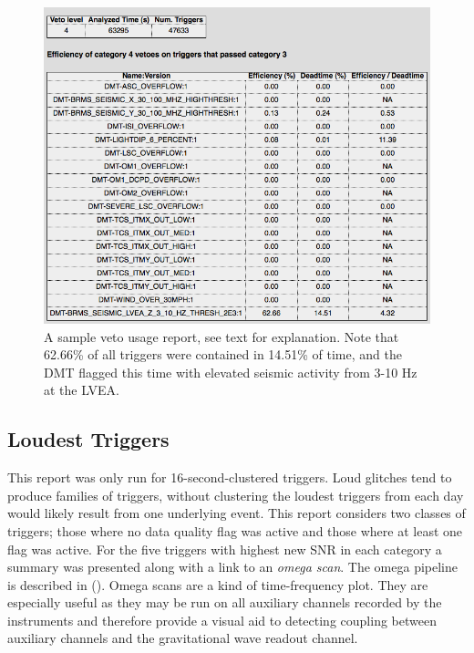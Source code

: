 \begin{figure}
  \includegraphics[width=\linewidth]{figures/detchar/vetousage.png}
  \caption[Sample veto usage report from Aug 19, 2010]{
  \label{f:daily_ihope_vetousage}
A sample veto usage report, see text for explanation.  Note that 62.66\% of
all triggers were contained in 14.51\% of time, and the DMT flagged this time
with elevated seismic activity from 3-10 Hz at the LVEA.}
\end{figure}%

\subsection{Loudest Triggers}

This report was only run for 16-second-clustered triggers.  Loud
glitches tend to produce families of triggers,  without clustering the
loudest triggers from each day would likely result from one underlying
event.  This report considers two classes of triggers; those where no
data quality flag was active and those where at least one flag was
active.  For the five triggers with highest new SNR in each category a
summary was presented along with a link to an \emph{omega scan}.  The
omega pipeline is described in ().  Omega scans
are a kind of time-frequency plot.  They are especially useful as they
may be run on all auxiliary channels recorded by the instruments and
therefore provide a visual aid to detecting coupling between auxiliary
channels and the gravitational wave readout channel.

